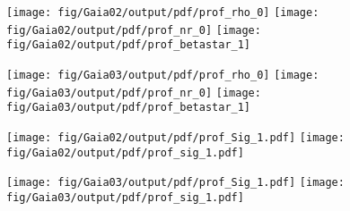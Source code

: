 \begin{figure*}
    \begin{center}
        \texttt{[image: fig/Gaia02/output/pdf/prof\_rho\_0]}\hspace{-3mm}
        \texttt{[image: fig/Gaia02/output/pdf/prof\_nr\_0]}\hspace{-3mm}
        \texttt{[image: fig/Gaia02/output/pdf/prof\_betastar\_1]}

        \texttt{[image: fig/Gaia03/output/pdf/prof\_rho\_0]}\hspace{-3mm}
        \texttt{[image: fig/Gaia03/output/pdf/prof\_nr\_0]}\hspace{-3mm}
        \texttt{[image: fig/Gaia03/output/pdf/prof\_betastar\_1]}

        \caption{Reconstructed density for 1pop core
          (top), and 1pop cusp (bottom); logarithmic density slope; and
          velocity anisotropy profile, using all
          tracer stars, on the order of 3000. The input model
          profile is marked by the blue dashed
          line; the red line and grey contours
          show the median, 68\% and 95\%
          confidence intervals for our chains,
          respectively; the vertical green line
          marks the 3D half-light radius of the
          stars; and the gray lines show a sub-set
          of individual models. The full ensemble
          shown samples of accepted models in
          total.}
        \label{fig:singlepop}
    \end{center}
\end{figure*}

\begin{figure*}
    \begin{center}
        \texttt{[image: fig/Gaia02/output/pdf/prof\_Sig\_1.pdf]}
        \texttt{[image: fig/Gaia02/output/pdf/prof\_sig\_1.pdf]}

        \texttt{[image: fig/Gaia03/output/pdf/prof\_Sig\_1.pdf]}
        \texttt{[image: fig/Gaia03/output/pdf/prof\_sig\_1.pdf]}
        \caption{\label{fig:Sigsiglos1pop} Tracer
          surface density profile $\Sigma(r)$, and
          projected velocity dispersion profile
          $\siglos(r)$ (right) for the stars in
          the single component cusped profile of
          Figure \ref{fig:singlepop}. The vertical
          green lines show the 3D projected
          half-light radius.}
    \end{center}
\end{figure*}

